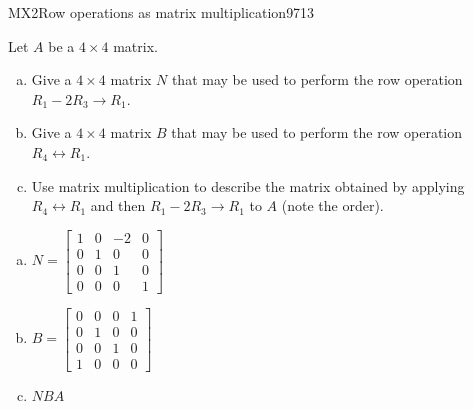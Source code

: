 \begin{exercise}{MX2}{Row operations as matrix multiplication}{9713} 
\begin{exerciseStatement} 

Let \(A\) be a \(4 \times 4\) matrix.

 

\begin{enumerate}[(a)]
\item Give a \(4 \times 4\) matrix \(N\) that may be used to perform the row operation \(R_1 - 2 R_3 \to R_1\).
\item Give a \(4 \times 4\) matrix \(B\) that may be used to perform the row operation \(R_4 \leftrightarrow R_1\).
\item Use matrix multiplication to describe the matrix obtained by applying \(R_4 \leftrightarrow R_1\) and then \(R_1 - 2 R_3 \to R_1\) to \(A\) (note the order). 
\end{enumerate}

     \end{exerciseStatement}
 \begin{exerciseAnswer} 

\begin{enumerate}[(a)]
\item \(N=\left[\begin{array}{cccc}
1 & 0 & -2 & 0 \\
0 & 1 & 0 & 0 \\
0 & 0 & 1 & 0 \\
0 & 0 & 0 & 1
\end{array}\right]\)
\item \(B=\left[\begin{array}{cccc}
0 & 0 & 0 & 1 \\
0 & 1 & 0 & 0 \\
0 & 0 & 1 & 0 \\
1 & 0 & 0 & 0
\end{array}\right]\)
\item  \(NBA\) 
\end{enumerate}

     \end{exerciseAnswer}
 \end{exercise}


